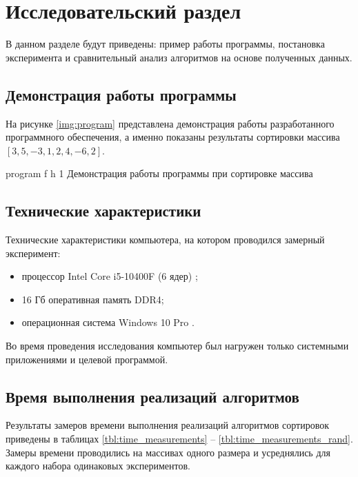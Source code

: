 \chapter{Исследовательский раздел}

В данном разделе будут приведены: пример работы программы, постановка эксперимента и сравнительный анализ алгоритмов на основе полученных данных.

\section{Демонстрация работы программы}


На рисунке \ref{img:program} представлена демонстрация работы разработанного программного обеспечения, а именно показаны результаты сортировки массива $[3, 5, -3, 1, 2, 4, -6, 2]$.  
\clearpage

{program} %
{f} %
{h} %
{1\textwidth} %
{Демонстрация работы программы при сортировке массива} %

\clearpage


\section{Технические характеристики}

Технические характеристики компьютера, на котором проводился замерный эксперимент:
\begin{itemize}
	\item процессор Intel Core i5-10400F (6 ядер) \cite{intel};
	\item 16 Гб оперативная память DDR4;
	\item операционная система Windows 10 Pro \cite{windows}.
\end{itemize}

Во время проведения исследования компьютер был нагружен только системными приложениями и целевой программой.

\section{Время выполнения реализаций алгоритмов}

Результаты замеров времени выполнения реализаций алгоритмов сортировок приведены в таблицах \ref{tbl:time_measurements} -- \ref{tbl:time_measurements_rand}.
Замеры времени проводились на массивах одного размера и усреднялись для каждого набора одинаковых экспериментов.

